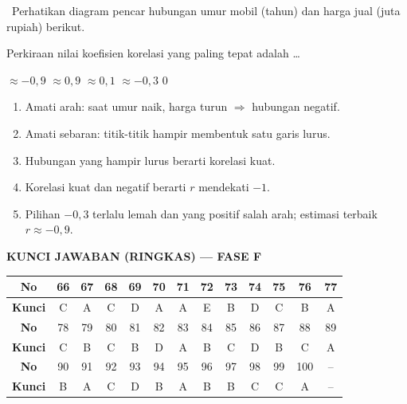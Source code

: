 \documentclass[11pt,a4paper]{exam}
\newenvironment{langkah}{%
  \begin{enumerate}[label=\textbf{Langkah \arabic*:},leftmargin=2.6em,
    itemsep=2pt,topsep=2pt]}{\end{enumerate}}
\newcommand{\Exp}{{\footnotesize\textsf{\textcolor{ungu}{[Expert]}}}\ }
\begin{document}
\begin{questions}
\question \Exp Perhatikan diagram pencar hubungan umur mobil (tahun) dan harga jual
(juta rupiah) berikut.

\begin{center}
\end{center}

Perkiraan nilai koefisien korelasi yang paling tepat adalah \dots
\begin{choices}
\CorrectChoice $\approx -0{,}9$ \choice $\approx 0{,}9$ \choice $\approx 0{,}1$
\choice $\approx -0{,}3$ \choice $0$
\end{choices}
\begin{solution}
\begin{langkah}
\item Amati arah: saat umur naik, harga turun $\Rightarrow$ hubungan negatif.
\item Amati sebaran: titik-titik hampir membentuk satu garis lurus.
\item Hubungan yang hampir lurus berarti korelasi kuat.
\item Korelasi kuat dan negatif berarti $r$ mendekati $-1$.
\item Pilihan $-0{,}3$ terlalu lemah dan yang positif salah arah; estimasi terbaik $r \approx -0{,}9$.
\end{langkah}
\end{solution}

\end{questions}

\clearpage
{\large\bfseries\color{biru} KUNCI JAWABAN (RINGKAS) — FASE F}\par
\vspace{8pt}
\renewcommand{\arraystretch}{1.3}
\begin{center}
\begin{tabular}{|c|*{12}{c|}}
\hline
\cellcolor{biru!15}\textbf{No}  & 66 & 67 & 68 & 69 & 70 & 71 & 72 & 73 & 74 & 75 & 76 & 77\\\hline
\cellcolor{biru!15}\textbf{Kunci} & C & A & C & D & A & A & E & B & D & C & B & A\\\hline\hline
\cellcolor{biru!15}\textbf{No}  & 78 & 79 & 80 & 81 & 82 & 83 & 84 & 85 & 86 & 87 & 88 & 89\\\hline
\cellcolor{biru!15}\textbf{Kunci} & C & B & C & B & D & A & B & C & D & B & C & A\\\hline\hline
\cellcolor{biru!15}\textbf{No}  & 90 & 91 & 92 & 93 & 94 & 95 & 96 & 97 & 98 & 99 & 100 & --\\\hline
\cellcolor{biru!15}\textbf{Kunci} & B & A & C & D & B & A & B & B & C & C & A & --\\\hline
\end{tabular}
\end{center}
\end{document}
